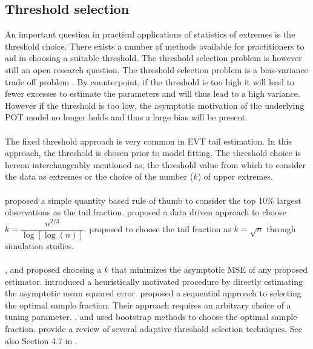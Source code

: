 \subsection{Threshold selection}\label{thresholdsection}
An important question in practical applications of statistics of extremes is the threshold choice. There exists a number of methods available for practitioners to aid in choosing a suitable threshold. The threshold selection problem is however still an open research question. The threshold selection problem is a bias-variance trade off problem \citep{coles2001introduction}. By counterpoint, if the threshold is too high it will lead to fewer excesses to estimate the parameters and will thus lead to a high variance. However if the threshold is too low, the asymptotic motivation of the underlying POT model no longer holds and thus a large bias will be present.
\\\\
The fixed threshold approach is very common in EVT tail estimation. In this approach, the threshold is chosen prior to model fitting. The threshold choice is hereon interchangeably mentioned as; the threshold value from which to consider the data as extremes or the choice of the number ($k$) of upper extremes. 
\\\\
\cite{dumouchel1983estimating} proposed a simple quantity based rule of thumb to consider the top 10\% largest observations as the tail fraction. \cite{loretan1994testing} proposed a data driven approach to choose $k=\dfrac{n^{2/3}}{\log[\log(n)]}$. \cite{ferreira2003optimising} proposed to choose the tail fraction as $k=\sqrt{n}$ through simulation studies. 
\\\\
\cite{hall}, \cite{dekkers1993optimal} and \cite{de1998comparison} proposed choosing a $k$ that minimizes the asymptotic MSE of any proposed estimator. \cite{beirlant1999tail} introduced a heuristically motivated procedure by directly estimating the asymptotic mean squared error. \cite{drees1998selecting} proposed a sequential approach to selecting the optimal sample fraction. Their approach requires an arbitrary choice of a tuning parameter. \cite{draisma1999bootstrap}, \cite{gomes2001bootstrap} and \cite{danielsson2001using} used bootstrap methods to choose the optimal sample fraction. \cite{matthys2000adaptive} provide a review of several adaptive threshold selection techniques. See also Section 4.7 in \cite{sts626}.
\\\\
